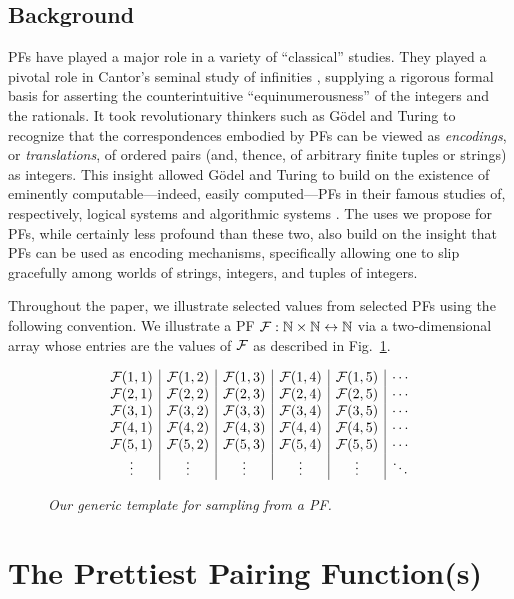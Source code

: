 \subsection{Background}

PFs have played a major role in a variety of ``classical'' studies.
They played a pivotal role in Cantor's seminal study of infinities
\cite{Cantor78}, supplying a rigorous formal basis for asserting the
counterintuitive ``equinumerousness'' of the integers and the
rationals.  It took revolutionary thinkers such as G\"{o}del and
Turing to recognize that the correspondences embodied by PFs can be
viewed as {\em encodings}, or {\em translations}, of ordered pairs
(and, thence, of arbitrary finite tuples or strings) as integers.
This insight allowed G\"{o}del and Turing to build on the existence of
eminently computable---indeed, easily computed---PFs in their famous
studies of, respectively, logical systems \cite{Godel31} and
algorithmic systems \cite{Turing36}.  The uses we propose for PFs,
while certainly less profound than these two, also build on the
insight that PFs can be used as encoding mechanisms, specifically
allowing one to slip gracefully among worlds of strings, integers, and
tuples of integers.

Throughout the paper, we illustrate selected values from selected PFs
using the following convention.  We illustrate a PF $\mbox{$\cal F$}: \mathbb{N} \times \mathbb{N}
\leftrightarrow \mathbb{N}$ via a two-dimensional array whose entries are the
values of $\mbox{$\cal F$}$ as described in Fig.~\ref{f.generic}.

\begin{figure}[htb]
\[ \begin{array}{c|c|c|c|c|c}
\mbox{$\cal F$}(1,1) & \mbox{$\cal F$}(1,2) & \mbox{$\cal F$}(1,3) & \mbox{$\cal F$}(1,4) & \mbox{$\cal F$}(1,5) & \cdots \\
\mbox{$\cal F$}(2,1) & \mbox{$\cal F$}(2,2) & \mbox{$\cal F$}(2,3) & \mbox{$\cal F$}(2,4) & \mbox{$\cal F$}(2,5) & \cdots \\
\mbox{$\cal F$}(3,1) & \mbox{$\cal F$}(3,2) & \mbox{$\cal F$}(3,3) & \mbox{$\cal F$}(3,4) & \mbox{$\cal F$}(3,5) & \cdots \\
\mbox{$\cal F$}(4,1) & \mbox{$\cal F$}(4,2) & \mbox{$\cal F$}(4,3) & \mbox{$\cal F$}(4,4) & \mbox{$\cal F$}(4,5) & \cdots \\
\mbox{$\cal F$}(5,1) & \mbox{$\cal F$}(5,2) & \mbox{$\cal F$}(5,3) & \mbox{$\cal F$}(5,4) & \mbox{$\cal F$}(5,5) & \cdots \\
\vdots  & \vdots  & \vdots  & \vdots  & \vdots  & \ddots
\end{array} \]
\caption{{\it Our generic template for sampling from a PF.}
\label{f.generic}}
\end{figure}

\section{The Prettiest Pairing Function(s)}
\label{s.diag}

